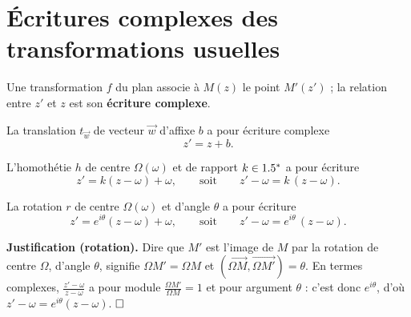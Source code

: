 \begin{illus}
\end{illus}

\section{Écritures complexes des transformations usuelles}

Une transformation $f$ du plan associe à $M(z)$ le point $M'(z')$ ; la relation entre $z'$ et $z$
est son \textbf{écriture complexe}.

\begin{definition}[Translation]
La translation $t_{\vec w}$ de vecteur $\vec w$ d'affixe $b$ a pour écriture complexe
\[
z'=z+b.
\]
\end{definition}

\begin{definition}[Homothétie]
L'homothétie $h$ de centre $\Omega(\omega)$ et de rapport $k\in1.5^{*}$ a pour écriture
\[
z'=k(z-\omega)+\omega,\qquad\text{soit}\qquad z'-\omega=k\,(z-\omega).
\]
\end{definition}

\begin{definition}[Rotation]
La rotation $r$ de centre $\Omega(\omega)$ et d'angle $\theta$ a pour écriture
\[
z'=e^{i\theta}(z-\omega)+\omega,\qquad\text{soit}\qquad z'-\omega=e^{i\theta}\,(z-\omega).
\]
\end{definition}

\noindent\textbf{Justification (rotation).} Dire que $M'$ est l'image de $M$ par la rotation de
centre $\Omega$, d'angle $\theta$, signifie $\Omega M'=\Omega M$ et
$(\overrightarrow{\Omega M},\overrightarrow{\Omega M'})=\theta$. En termes complexes,
$\frac{z'-\omega}{z-\omega}$ a pour module $\frac{\Omega M'}{\Omega M}=1$ et pour argument $\theta$ :
c'est donc $e^{i\theta}$, d'où $z'-\omega=e^{i\theta}(z-\omega)$. $\hfill\square$

